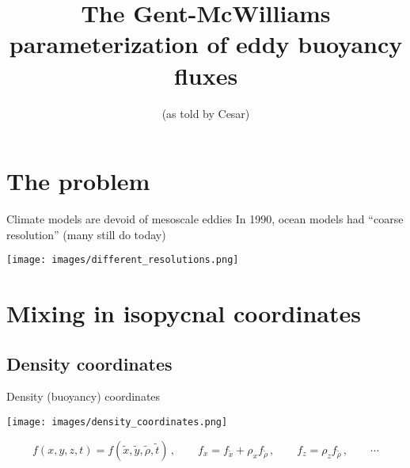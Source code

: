 \documentclass{beamer}
\begin{document}



\title[The Gent-McWilliams parameterization]{\LARGE{\bf The {\Huge Gent-McWilliams} parameterization
of  {\Huge eddy buoyancy fluxes}}}
\subtitle{}
\author[PO theory seminar, SIO, fall 2016]{(as told by Cesar)}
\date{}

%
%

\frame{\titlepage}

%
%

\section{The problem}

\begin{frame}{Climate models are devoid of mesoscale eddies}
{In 1990, ocean models had ``coarse resolution'' (many still do today)}
\begin{center}
{\texttt{[image: images/different\_resolutions.png]}}
\end{center}
\end{frame}

\section{Mixing in isopycnal coordinates}

\subsection{Density coordinates}
\begin{frame}{Density (buoyancy) coordinates}
{}
\begin{center}
{\texttt{[image: images/density\_coordinates.png]}}
\end{center}
\vspace{-.25cm}
$$
f(x,y,z,t) = f(\tilde x, \tilde y, \tilde \rho, \tilde t)\,, \qquad
f_x = f_{\tilde x} + \rho_x f_{\tilde \rho}\,, \qquad f_z =\rho_z f_{\tilde \rho}\,, \qquad \cdots
$$
\end{frame}
\end{document}
